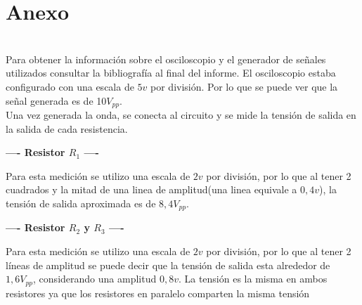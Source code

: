 \saltoPag{}
\section{Anexo}
    \\
    \sangria{} Para obtener la información sobre el osciloscopio y el generador de señales utilizados consultar la bibliografía al final del informe.
    \sangria{} El osciloscopio estaba configurado con una escala de $5v$ por división. Por lo que se puede ver que la señal generada es de 10$V_{pp}$.
    \\
    \sangria{} Una vez generada la onda, se conecta al circuito y se mide la tensión de salida en la salida de cada resistencia.
    \begin{center} \textbf{---- Resistor $R_1$ ----} \end{center}
    \sangria{} Para esta medición se utilizo una escala de $2v$ por división, por lo que al tener 2 cuadrados y la mitad de una linea de amplitud(una linea equivale a $0,4v$), la tensión de salida aproximada es de $8,4V_{pp}$.
    \columnbreak{}
    \begin{center} \textbf{---- Resistor $R_2$ y $R_3$ ----} \end{center}
    \sangria{} Para esta medición se utilizo una escala de $2v$ por división, por lo que al tener 2 líneas de amplitud se puede decir que la tensión de salida esta alrededor de $1,6V_{pp}$, considerando una amplitud $0,8v$. La tensión es la misma en ambos resistores ya que los resistores en paralelo comparten la misma tensión

